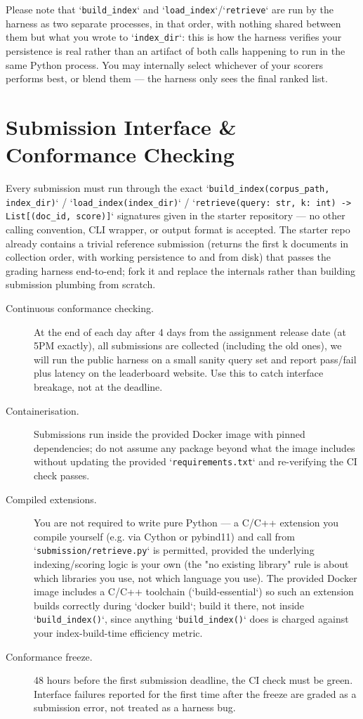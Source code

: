 \documentclass[10pt]{article}
\newcommand{\STARTDAY}{4\xspace}
\begin{document}
	Please note that `\texttt{build\_index}` and `\texttt{load\_index}`/`\texttt{retrieve}` are run by the harness as two separate processes, in that order, with nothing shared between them but what you wrote to `\texttt{index\_dir}`: this is how the harness verifies your persistence is real rather than an artifact of both calls happening to run in the same Python process. You may internally select whichever of your scorers performs best, or blend them — the harness only sees the final ranked list.


\section{Submission Interface \& Conformance Checking}

Every submission must run through the exact `\texttt{build\_index(corpus\_path, index\_dir)}` / `\texttt{load\_index(index\_dir)}` / `\texttt{retrieve(query: str, k: int) -> List[(doc\_id, score)]}` signatures given in the starter repository — no other calling convention, CLI wrapper, or output format is accepted. The starter repo already contains a trivial reference submission (returns the first k documents in collection order, with working persistence to and from disk) that passes the grading harness end-to-end; fork it and replace the internals rather than building submission plumbing from scratch.
\begin{description}
\item [Continuous conformance checking.] At the end of each day after \STARTDAY days from the assignment release date (at 5PM exactly), all submissions are collected (including the old ones), we will run the public harness on a small sanity query set and report pass/fail plus latency on the leaderboard website. Use this to catch interface breakage, not at the deadline. 
\item [Containerisation.] Submissions run inside the provided Docker image with pinned dependencies; do not assume any package beyond what the image includes without updating the provided `\texttt{requirements.txt}` and re-verifying the CI check passes.
\item [Compiled extensions.] You are not required to write pure Python — a C/C++ extension you compile yourself (e.g. via Cython or pybind11) and call from `\texttt{submission/retrieve.py}` is permitted, provided the underlying indexing/scoring logic is your own (the "no existing library" rule is about which libraries you use, not which language you use). The provided Docker image includes a C/C++ toolchain (`build-essential`) so such an extension builds correctly during `docker build`; build it there, not inside `\texttt{build\_index()}`, since anything `\texttt{build\_index()}` does is charged against your index-build-time efficiency metric.
\item [Conformance freeze.] 48 hours before the first submission deadline, the CI check must be green. Interface failures reported for the first time after the freeze are graded as a submission error, not treated as a harness bug.

\end{description}
\end{document}
